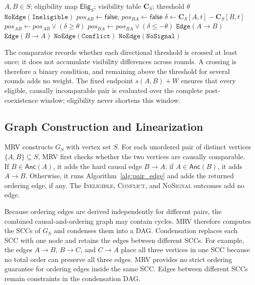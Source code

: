\begin{algorithm}
\caption{Ordering edge for a causally incomparable pair}
\label{alg:pair_edge}
\begin{algorithmic}[1]
\Require $A,B\in S$; eligibility map $\mathsf{Elig}_S$;
         visibility table $\mathbf{C}_S$; threshold $\theta$
    \State \Return $\mathtt{NoEdge(Ineligible)}$
\EndIf
\State $pos_{AB}\gets\mathsf{false}$; $pos_{BA}\gets\mathsf{false}$
    \State $\delta\gets\mathbf{C}_S[A,t]-\mathbf{C}_S[B,t]$
    \State $pos_{AB}\gets pos_{AB}\lor(\delta\geq\theta)$
    \State $pos_{BA}\gets pos_{BA}\lor(\delta\leq-\theta)$
\EndFor
{}
    \State \Return $\mathtt{Edge}(A\to B)$
    \State \Return $\mathtt{Edge}(B\to A)$
    \State \Return $\mathtt{NoEdge(Conflict)}$
\Else
    \State \Return $\mathtt{NoEdge(NoSignal)}$
\EndIf
\end{algorithmic}
\end{algorithm}

The comparator records whether each directional threshold is crossed at least once; it does not accumulate visibility differences across rounds. A crossing is therefore a binary condition, and remaining above the threshold for several rounds adds no weight. The fixed endpoint $s(A,B)+W$ ensures that every eligible, causally incomparable pair is evaluated over the complete post-coexistence window; eligibility never shortens this window.

\subsection{Graph Construction and Linearization}
\label{sec:graph_linearization}

MRV constructs $G_S$ with vertex set $S$. For each unordered pair of distinct vertices $\{A,B\}\subseteq S$, MRV first checks whether the two vertices are causally comparable. If $B\in\mathsf{Anc}(A)$, it adds the hard causal edge $B\to A$; if $A\in\mathsf{Anc}(B)$, it adds $A\to B$. Otherwise, it runs Algorithm~\ref{alg:pair_edge} and adds the returned ordering edge, if any. The \textsc{Ineligible}, \textsc{Conflict}, and \textsc{NoSignal} outcomes add no edge.

Because ordering edges are derived independently for different pairs, the combined causal-and-ordering graph may contain cycles. MRV therefore computes the SCCs of $G_S$ and condenses them into a
DAG. Condensation replaces each SCC with one node and retains the edges between different SCCs. For example, the edges $A\to B$, $B\to C$, and $C\to A$ place all three vertices in one SCC because no total order can preserve all three edges. MRV provides no strict ordering guarantee for ordering edges inside the same SCC. Edges between different SCCs remain constraints in the condensation DAG.

